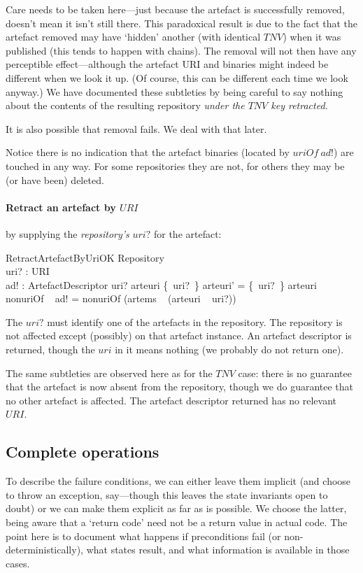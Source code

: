 \documentclass[a4paper,titlepage,twoside,12pt]{article}
\begin{document}
Care needs to be taken here---just because the artefact is successfully removed, doesn't mean it isn't still there.  This paradoxical result
is due to the fact that the artefact removed may have `hidden' another (with identical $TNV$) when it was published (this tends to happen with chains). 
The removal will not then have any perceptible effect---although the artefact URI and binaries might indeed be different when we look it up. 
(Of course, this can be different each time we look anyway.)
We have documented these subtleties by being careful to say nothing about the contents of the resulting repository 
\emph{under the $TNV$ key retracted.}

It is also possible that removal fails. We deal with that later.

Notice there is no indication that the artefact binaries (located by $uriOf ~ ad!$) are touched in any way. For some repositories they are not, for others they may be (or have been) deleted.

\paragraph{Retract an artefact by $URI$} by supplying the \emph{repository's} $uri?$ for the artefact:
\begin{schema}{RetractArtefactByUriOK}
	\Delta Repository	\\
	uri? : URI	\\
	ad! : ArtefactDescriptor
\where
	uri? \in \dom arteuri
\also
	\{~uri?~\} \ndres arteuri' = \{~uri?~\} \ndres arteuri
\also
	nonuriOf ~ ad! = nonuriOf  (artems ~ (arteuri ~ uri?))
\end{schema}
The $uri?$ must identify one of the artefacts in the repository.
The repository is not affected except (possibly) on that artefact instance.
An artefact descriptor is returned, though the $uri$ in it means nothing (we probably do not return one).

The same subtleties are observed here as for the $TNV$ case: there is no guarantee that the artefact is now absent from the repository, though we do guarantee that no other artefact is affected.
The artefact descriptor returned has no relevant $URI$.

\subsection{Complete operations}
To describe the failure conditions, we can either leave them implicit (and choose to throw an exception, say---though this leaves the state invariants open to doubt) or we can make them explicit as far as is possible. We choose the latter, being aware that a `return code' need not be a return value in actual code. The point here is to document what happens if preconditions fail (or non-deterministically), what states result, and what information is available in those cases.
\end{document}

